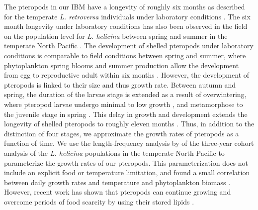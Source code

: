 The pteropods in our IBM have a longevity of roughly six months as described for the temperate \textit{L. retroversa} individuals under laboratory conditions \citep{Thabet2015Lifestages}. The six month longevity under laboratory conditions has also been observed in the field on the population level for \textit{L. helicina} between spring and summer in the temperate North Pacific \citep{Wang2017Lifecycle}. The development of shelled pteropods under laboratory conditions is comparable to field conditions between spring and summer, where phytoplankton spring blooms and summer production allow the development from egg to reproductive adult within six months \citep{Wang2017Lifecycle}. However, the development of pteropods is linked to their size and thus growth rate. Between autumn and spring, the duration of the larvae stage is extended as a result of overwintering, where pteropod larvae undergo minimal to low growth \citep{Wang2017Lifecycle}, and metamorphose to the juvenile stage in spring \citep{Hunt2008TopPredators}. This delay in growth and development extends the longevity of shelled pteropods to roughly eleven months \citep{Wang2017Lifecycle}. Thus, in addition to the distinction of four stages, we approximate the growth rates of pteropods as a function of time. We use the length-frequency analysis by \cite{Wang2017Lifecycle}  of the three-year cohort analysis of the \textit{L. helicina} populations in the temperate North Pacific to parameterize the growth rates of our pteropods. This parameterization does not include an explicit food or temperature limitation, and  found a small correlation between daily growth rates and temperature and phytoplankton biomass \citep{Wang2017Lifecycle}. However, recent work has shown that pteropods can continue growing and overcome periods of food scarcity by using their stored lipids \citep{Maas2020Lipids}. 

